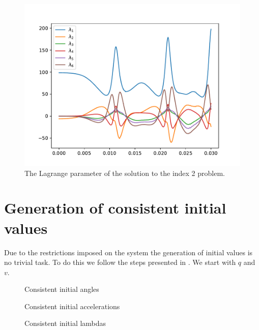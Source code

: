 \documentclass{report}
\begin{document}
\begin{figure}[t]
\centering
\begin{minipage}[b]{0.45\textwidth}
\centering
\includegraphics[width=\textwidth]{../Plots/Project2_main/Figure_512}
\caption{The Lagrange parameter of the solution to the index 2 problem.}
\label{pl:indx3_soln_lambdas}
\end{minipage}
\end{figure}



\section*{Generation of consistent initial values}

Due to the restrictions imposed on the system the generation of initial values is no trivial task. To do this we follow the steps presented in \cite{HW_SolvingODEs}. We start with $q$ and $v$.


\begin{figure}[h]
\centering
\begin{minipage}[b]{0.3\textwidth}
\centering

\caption{Consistent initial angles}
\label{tb:initial_angles}
\end{minipage}
\hfill
\begin{minipage}[b]{0.3\textwidth}
\centering

\caption{Consistent initial accelerations}
\label{tb:initial_accelerations}
\end{minipage}
\hfill
\begin{minipage}[b]{0.3\textwidth}
\centering

\caption{Consistent initial lambdas}
\label{tb:initial_lambdas}
\end{minipage}
\end{figure}
\end{document}
